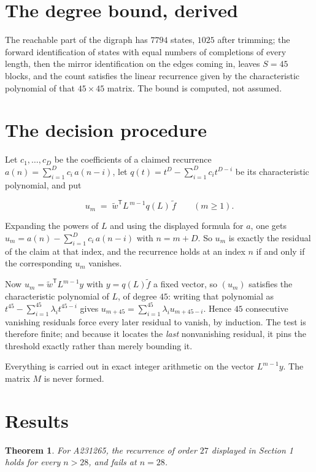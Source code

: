 \documentclass[11pt]{article}
\newtheorem{theorem}{Theorem}
\theoremstyle{definition}
\begin{document}
\section{The degree bound, derived}

The reachable part of the digraph has $7794$ states, $1025$ after trimming; the forward identification of states with equal numbers of completions of every length, then the mirror identification on the edges coming in, leaves $S = 45$ blocks, and the count satisfies the linear recurrence given by the characteristic polynomial of that $45\times45$ matrix. The bound is computed, not assumed.

\section{The decision procedure}

Let $c_1,\dots,c_D$ be the coefficients of a claimed recurrence $a(n) = \sum_{i=1}^{D} c_i\,a(n-i)$, let $q(t) = t^{D} - \sum_{i=1}^{D} c_i t^{D-i}$ be its characteristic polynomial, and put

\[u_m \;=\; \tilde w^{\mathsf T} L^{\,m-1} q(L)\,\tilde f \qquad (m \ge 1).\]

Expanding the powers of $L$ and using the displayed formula for $a$, one gets $u_m = a(n) - \sum_{i=1}^{D} c_i\,a(n-i)$ with $n = m + D$. So $u_m$ is exactly the residual of the claim at that index, and the recurrence holds at an index $n$ if and only if the corresponding $u_m$ vanishes.

Now $u_m = \tilde w^{\mathsf T} L^{m-1} y$ with $y = q(L)\tilde f$ a fixed vector, so $(u_m)$ satisfies the characteristic polynomial of $L$, of degree $45$: writing that polynomial as $t^{45} - \sum_{i=1}^{45} \lambda_i t^{45-i}$ gives $u_{m+45} = \sum_{i=1}^{45} \lambda_i u_{m+45-i}$. Hence $45$ consecutive vanishing residuals force every later residual to vanish, by induction. The test is therefore finite; and because it locates the {\itshape last} nonvanishing residual, it pins the threshold exactly rather than merely bounding it.

Everything is carried out in exact integer arithmetic on the vector $L^{m-1}y$. The matrix $M$ is never formed.

\section{Results}

\begin{theorem} For A231265, the recurrence of order $27$ displayed in Section 1 holds for every $n > 28$, and fails at $n = 28$.\end{theorem}
\end{document}
